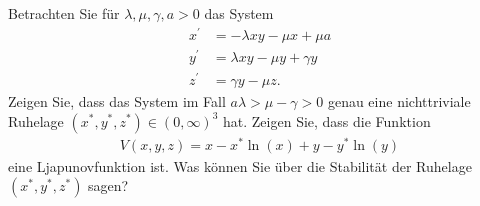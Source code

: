 \begin{exercise}
Betrachten Sie für $\lambda, \mu, \gamma, a > 0$ das System
\begin{align*}
  x^{\prime} &= - \lambda xy - \mu x + \mu a \\
  y^{\prime} &= \lambda xy - \mu y + \gamma y \\
  z^{\prime} &= \gamma y - \mu z.
\end{align*}
Zeigen Sie, dass das System im Fall $a\lambda > \mu - \gamma > 0$ genau eine
nichttriviale Ruhelage $(x^*,y^*,z^*) \in (0,\infty)^3$ hat. Zeigen Sie, dass
die Funktion
\begin{align*}
  V(x,y,z) = x - x^*\ln(x) + y - y^*\ln(y)
\end{align*}
eine Ljapunovfunktion ist. Was können Sie über die Stabilität der Ruhelage $(x^*,y^*,z^*)$
sagen?
\end{exercise}

